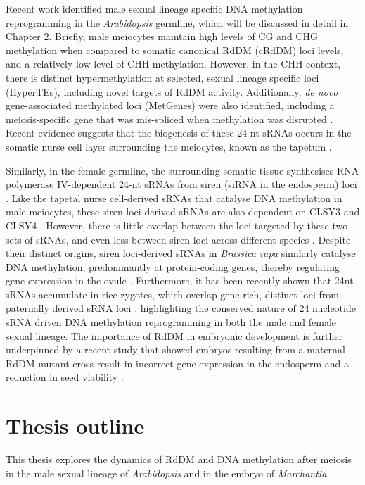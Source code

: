Recent work identified male sexual lineage specific DNA methylation reprogramming in the \textit{Arabidopsis} germline, which will be discussed in detail in Chapter 2. Briefly, male meiocytes maintain high levels of CG and CHG methylation when compared to somatic canonical RdDM (cRdDM) loci levels, and a relatively low level of CHH methylation. However, in the CHH context, there is distinct hypermethylation at selected, sexual lineage specific loci (HyperTEs), including novel targets of RdDM activity. Additionally, \textit{de novo} gene-associated methylated loci (MetGenes) were also identified, including a meiosis-specific gene that was mis-spliced when methylation was disrupted \cite{RN199}. Recent evidence suggests that the biogenesis of these 24-nt sRNAs occurs in the somatic nurse cell layer surrounding the meiocytes, known as the tapetum \cite{RN187}. 

Similarly, in the female germline, the surrounding somatic tissue synthesises RNA polymerase IV-dependent 24-nt sRNAs from siren (siRNA in the endosperm) loci \cite{RN164,RN163,RN162}. Like the tapetal nurse cell-derived sRNAs that catalyse DNA methylation in male meiocytes, these siren loci-derived sRNAs are also dependent on CLSY3 and CLSY4 \cite{RN162}. However, there is little overlap between the loci targeted by these two sets of sRNAs, and even less between siren loci across different species \cite{RN163}. Despite their distinct origins, siren loci-derived sRNAs in \textit{Brassica rapa} similarly catalyse DNA methylation, predominantly at protein-coding genes, thereby regulating gene expression in the ovule \cite{RN165}. Furthermore, it has been recently shown that 24nt sRNAs accumulate in rice zygotes, which overlap gene rich, distinct loci from paternally derived sRNA loci \cite{RN166}, highlighting the conserved nature of 24 nucleotide sRNA driven DNA methylation reprogramming in both the male and female sexual lineage. The importance of RdDM in embryonic development is further underpinned by a recent study that showed embryos resulting from a maternal RdDM mutant cross result in incorrect gene expression in the endosperm and a reduction in seed viability \cite{RN167}.

\section{Thesis outline}

This thesis explores the dynamics of RdDM and DNA methylation after meiosis in the male sexual lineage of \textit{Arabidopsis} and in the embryo of \textit{Marchantia}.

